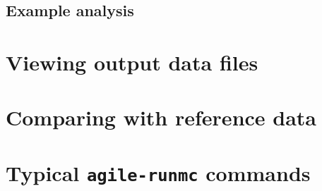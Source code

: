 \documentclass{JHEP3}
\newcommand{\kbd}[1]{\texttt{#1}\xspace}
\begin{document}
\subsection{Example analysis}

\section{Viewing output data files}

\section{Comparing with reference data}


\appendix

\section{Typical \kbd{agile-runmc} commands}
\label{app:agilerunmc}
\end{document}
